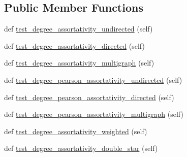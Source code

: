 \subsection*{Public Member Functions}
\begin{DoxyCompactItemize}
\item 
def \hyperlink{classnetworkx_1_1algorithms_1_1assortativity_1_1tests_1_1test__correlation_1_1TestDegreeMixingCorrelation_a1749dbcf79eb1f9efa9ea57cf7ce5cbb}{test\+\_\+degree\+\_\+assortativity\+\_\+undirected} (self)
\item 
def \hyperlink{classnetworkx_1_1algorithms_1_1assortativity_1_1tests_1_1test__correlation_1_1TestDegreeMixingCorrelation_a7f04f8a86f04187c41a6e85595db7e23}{test\+\_\+degree\+\_\+assortativity\+\_\+directed} (self)
\item 
def \hyperlink{classnetworkx_1_1algorithms_1_1assortativity_1_1tests_1_1test__correlation_1_1TestDegreeMixingCorrelation_a167b1d1db6e1e7df12efd06c60cbdd3d}{test\+\_\+degree\+\_\+assortativity\+\_\+multigraph} (self)
\item 
def \hyperlink{classnetworkx_1_1algorithms_1_1assortativity_1_1tests_1_1test__correlation_1_1TestDegreeMixingCorrelation_a2f9666b922a69524ad8f8f4003be5d84}{test\+\_\+degree\+\_\+pearson\+\_\+assortativity\+\_\+undirected} (self)
\item 
def \hyperlink{classnetworkx_1_1algorithms_1_1assortativity_1_1tests_1_1test__correlation_1_1TestDegreeMixingCorrelation_a3be4470c59e08e3c2431031b9ffc28cd}{test\+\_\+degree\+\_\+pearson\+\_\+assortativity\+\_\+directed} (self)
\item 
def \hyperlink{classnetworkx_1_1algorithms_1_1assortativity_1_1tests_1_1test__correlation_1_1TestDegreeMixingCorrelation_a3b55f44072598c6765002b65d56d798a}{test\+\_\+degree\+\_\+pearson\+\_\+assortativity\+\_\+multigraph} (self)
\item 
def \hyperlink{classnetworkx_1_1algorithms_1_1assortativity_1_1tests_1_1test__correlation_1_1TestDegreeMixingCorrelation_af3399547bd443d997a8633b2dc90a65d}{test\+\_\+degree\+\_\+assortativity\+\_\+weighted} (self)
\item 
def \hyperlink{classnetworkx_1_1algorithms_1_1assortativity_1_1tests_1_1test__correlation_1_1TestDegreeMixingCorrelation_a39ec18b573f78769ed2c8a07ba680fca}{test\+\_\+degree\+\_\+assortativity\+\_\+double\+\_\+star} (self)
\end{DoxyCompactItemize}


